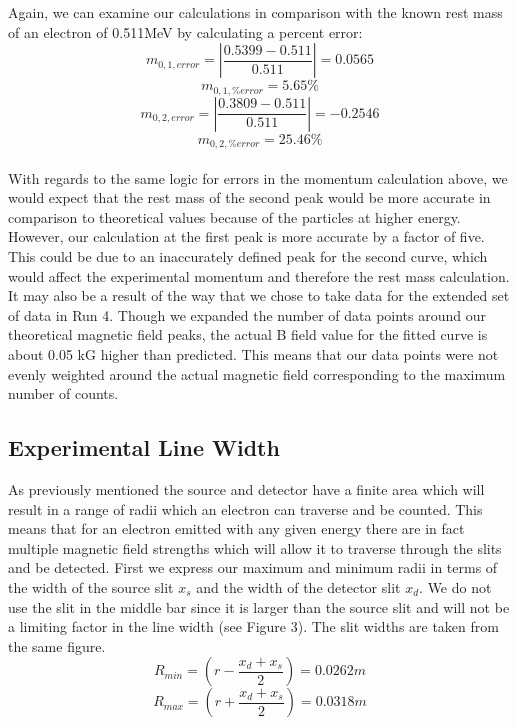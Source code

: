 Again, we can examine our calculations in comparison with the known rest mass of an electron of 0.511MeV by calculating a percent error:
\begin{equation} m_{0,1,error}=|\frac{0.5399-0.511}{0.511}|=0.0565\end{equation}
\begin{equation} m_{0,1,\%error}=5.65\%\end{equation}
\begin{equation} m_{0,2,error}=|\frac{0.3809-0.511}{0.511}|=-0.2546\end{equation}
\begin{equation} m_{0,2,\%error}=25.46\%\end{equation}\\
With regards to the same logic for errors in the momentum calculation above, we would expect that the rest mass of the second peak would be more accurate in comparison to theoretical values because of the particles at higher energy. However, our calculation at the first peak is more accurate by a factor of five. This could be due to an inaccurately defined peak for the second curve, which would affect the experimental momentum and therefore the rest mass calculation. It may also be a result of the way that we chose to take data for the extended set of data in Run 4. Though we expanded the number of data points around our theoretical magnetic field peaks, the actual B field value for the fitted curve is about 0.05 kG higher than predicted. This means that our data points were not evenly weighted around the actual magnetic field corresponding to the maximum number of counts. 

\subsection{Experimental Line Width}
As previously mentioned the source and detector have a finite area which will result in a range of radii which an electron can traverse and be counted. This means that for an electron emitted with any given energy there are in fact multiple magnetic field strengths which will allow it to traverse through the slits and be detected. First we express our maximum and minimum radii in terms of the width of the source slit $x_s$ and the width of the detector slit $x_d$.  We do not use the slit in the middle bar since it is larger than the source slit and will not be a limiting factor in the line width (see Figure 3). The slit widths are taken from the same figure. 
\begin{equation}
R_{min} = (r-\frac{x_d + x_s}{2}) = 0.0262 m 
\end{equation}  
\begin{equation}
R_{max} = (r+\frac{x_d + x_s}{2}) = 0.0318 m 
\end{equation}  

